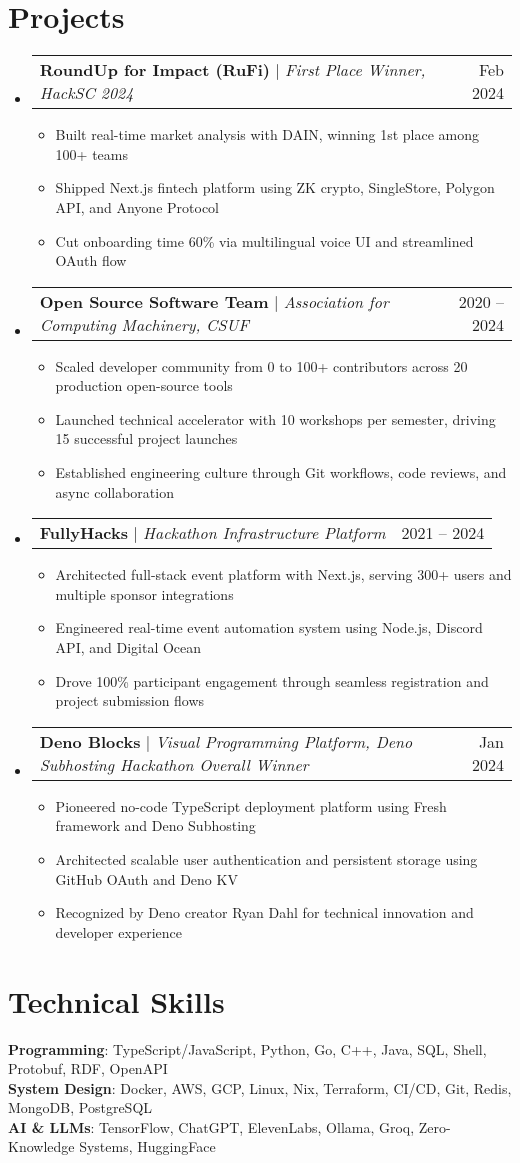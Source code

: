 \documentclass[letterpaper,12pt]{article}
\makeatletter
\newcommand{\resumeItem}[1]{
  \item\small{
    {#1 \vspace{-2pt}}
  }
}
\newcommand{\resumeProjectHeading}[2]{
    \item
    \begin{tabular*}{0.97\textwidth}{l@{\extracolsep{\fill}}r}
      \small#1 & #2 \\
    \end{tabular*}\vspace{-7pt}
}
\newcommand{\resumeSubHeadingListStart}{\begin{itemize}[leftmargin=0.15in, label={}]}
\newcommand{\resumeSubHeadingListEnd}{\end{itemize}}
\newcommand{\resumeItemListStart}{\begin{itemize}}
\newcommand{\resumeItemListEnd}{\end{itemize}\vspace{-5pt}}
\makeatother
\begin{document}
\section{Projects}
\resumeSubHeadingListStart
  \resumeProjectHeading
    {\textbf{RoundUp for Impact (RuFi)} $|$ \emph{First Place Winner, HackSC 2024}}{Feb 2024}
    \resumeItemListStart
      \resumeItem{Built real-time market analysis with DAIN, winning 1st place among 100+ teams}
      \resumeItem{Shipped Next.js fintech platform using ZK crypto, SingleStore, Polygon API, and Anyone Protocol}
      \resumeItem{Cut onboarding time 60\% via multilingual voice UI and streamlined OAuth flow}
    \resumeItemListEnd

  \resumeProjectHeading
    {\textbf{Open Source Software Team} $|$ \emph{Association for Computing Machinery, CSUF}}{2020 -- 2024}
    \resumeItemListStart
      \resumeItem{Scaled developer community from 0 to 100+ contributors across 20 production open-source tools}
      \resumeItem{Launched technical accelerator with 10 workshops per semester, driving 15 successful project launches}
      \resumeItem{Established engineering culture through Git workflows, code reviews, and async collaboration}
    \resumeItemListEnd

  \resumeProjectHeading
    {\textbf{FullyHacks} $|$ \emph{Hackathon Infrastructure Platform}}{2021 -- 2024}
    \resumeItemListStart
      \resumeItem{Architected full-stack event platform with Next.js, serving 300+ users and multiple sponsor integrations}
      \resumeItem{Engineered real-time event automation system using Node.js, Discord API, and Digital Ocean}
      \resumeItem{Drove 100\% participant engagement through seamless registration and project submission flows}
    \resumeItemListEnd

  \resumeProjectHeading
    {\textbf{Deno Blocks} $|$ \emph{Visual Programming Platform, Deno Subhosting Hackathon Overall Winner}}{Jan 2024}
    \resumeItemListStart
      \resumeItem{Pioneered no-code TypeScript deployment platform using Fresh framework and Deno Subhosting}
      \resumeItem{Architected scalable user authentication and persistent storage using GitHub OAuth and Deno KV}
      \resumeItem{Recognized by Deno creator Ryan Dahl for technical innovation and developer experience}
    \resumeItemListEnd
  \resumeSubHeadingListEnd


\section{Technical Skills}
\begin{itemize}[leftmargin=0.15in, label={}]
      \small{\item{
    \textbf{Programming}{: TypeScript/JavaScript, Python, Go, C++, Java, SQL, Shell, Protobuf, RDF, OpenAPI} \\
    \textbf{System Design}{: Docker, AWS, GCP, Linux, Nix, Terraform, CI/CD, Git, Redis, MongoDB, PostgreSQL} \\
    \textbf{AI \& LLMs}{: TensorFlow, ChatGPT, ElevenLabs, Ollama, Groq, Zero-Knowledge Systems, HuggingFace}
    }}
 \end{itemize}


\end{document}
